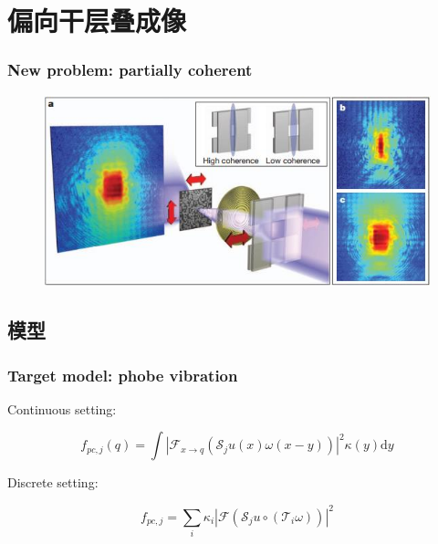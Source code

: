 \documentclass[UTF8]{beamer}
\begin{document}
\section{偏向干层叠成像}
\begin{frame}[c]\frametitle{New problem: partially coherent}

\begin{figure}
\includegraphics[width=1\linewidth]{../figures0/partially.jpg}  
  \end{figure}
\end{frame}

\subsection{模型}
\begin{frame} \frametitle{Target model: phobe vibration}
	
	Continuous setting:
	
	\begin{equation}
	f_{p c, j}(q) = \int\left|\mathcal{F}_{x \rightarrow q}\left(\mathcal{S}_{j} u(x) \omega(x-y)\right)\right|^{2} \kappa(y) \mathrm{d} y
	\end{equation}
	
	Discrete setting:
	
	\begin{equation}
	f_{p c, j}=\sum_{i} \kappa_{i}\left|\mathcal{F}\left( \mathcal{S}_{j} u \circ \left(\mathcal{T}_{i} \omega\right) \right)\right|^{2}
	\label{model:target}
	\end{equation}
	

\end{frame}
\end{document}
